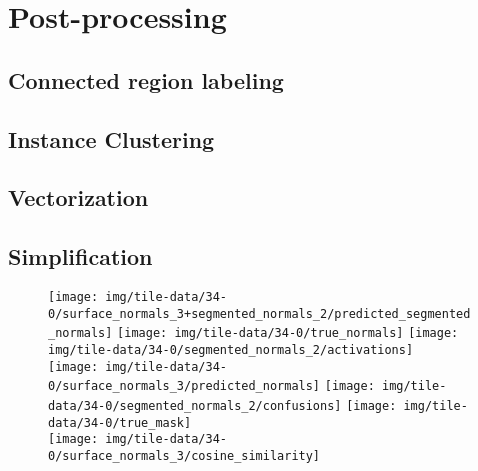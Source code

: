 \chapter{Post-processing}%
\label{chap:post-processing}



\newpage
\section{Connected region labeling}%
\label{sec:connected-region-labeling}


\newpage
\section{Instance Clustering}%
\label{sec:instance-clustering}


\section{Vectorization}%
\label{sec:vectorization}


\section{Simplification}%
\label{sec:simplification}


\begin{figure}
  \centering
  \texttt{[image: img/tile-data/34-0/surface\_normals\_3+segmented\_normals\_2/predicted\_segmented\_normals]}
  \texttt{[image: img/tile-data/34-0/true\_normals]}
  \texttt{[image: img/tile-data/34-0/segmented\_normals\_2/activations]}
  \\
  \texttt{[image: img/tile-data/34-0/surface\_normals\_3/predicted\_normals]}
  \texttt{[image: img/tile-data/34-0/segmented\_normals\_2/confusions]}
  \texttt{[image: img/tile-data/34-0/true\_mask]}
  \\
  \hspace{2.15em}\texttt{[image: img/tile-data/34-0/surface\_normals\_3/cosine\_similarity]}
\end{figure}
